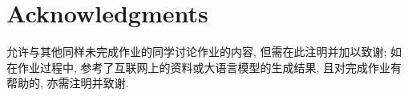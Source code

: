 \documentclass[a4paper]{article}
\numberwithin{equation}{section}
\theoremstyle{definition}
\begin{document}
\newpage

\section*{Acknowledgments}
允许与其他同样未完成作业的同学讨论作业的内容, 但需在此注明并加以致谢; 如在作业过程中, 参考了互联网上的资料或大语言模型的生成结果, 且对完成作业有帮助的, 亦需注明并致谢.
\end{document}
